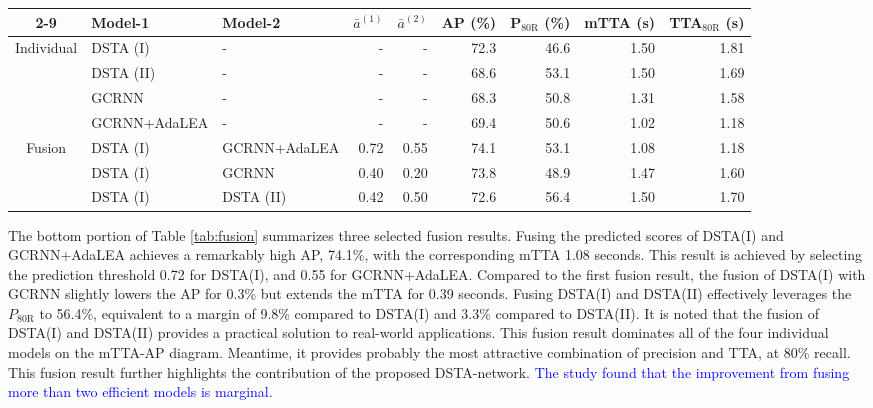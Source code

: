 \documentclass[journal]{IEEEtran}
\begin{document}
\begin{table*}[t]
\renewcommand{\arraystretch}{1.3}
\caption{Assessment of the fusion method}
    \label{tab:fusion}
    \centering
    \begin{tabular}{c|l|l|r|r|r|r|r|r}
        \cline{2-9}
          \multicolumn{1}{c}{}&Model-1 & Model-2& $\bar{a}^{(1)}$ & $\bar{a}^{(2)}$ & AP (\%) & P$_{80\text{R}}$ (\%)  & mTTA (s) & TTA$_{80\text{R}}$ (s)   \\
         \hline
        \multirow{4}{*}{Individual}& DSTA (I)&-&-&-& 72.3 & 46.6 & 1.50 & 1.81 \\ 
         & DSTA (II)&-&-&-& 68.6 & 53.1 & 1.50 & 1.69 \\
         &GCRNN &-&-&-& 68.3 & 50.8 & 1.31 & 1.58 \\
         &GCRNN+AdaLEA&-&-&- & 69.4 & 50.6 & 1.02 & 1.18 \\
         \hline
         \multirow{3}{*}{Fusion}& DSTA (I)& GCRNN+AdaLEA & 0.72 & 0.55 & 74.1 & 53.1 & 1.08 & 1.18 \\
         & DSTA (I)& GCRNN & 0.40 & 0.20 & 73.8 & 48.9 & 1.47 & 1.60 \\
        & DSTA (I)& DSTA (II) & 0.42 & 0.50 & 72.6 & 56.4 & 1.50 & 1.70 \\
        \hline
    \end{tabular}
\end{table*}

The bottom portion of Table \ref{tab:fusion} summarizes three selected fusion results. Fusing the predicted scores of DSTA(I) and GCRNN+AdaLEA achieves a remarkably high AP, 74.1\%, with the corresponding mTTA 1.08 seconds. This result is achieved by selecting the prediction threshold 0.72 for DSTA(I), and 0.55 for GCRNN+AdaLEA. Compared to the first fusion result, the fusion of DSTA(I) with GCRNN slightly lowers the AP for 0.3\% but extends the mTTA for 0.39 seconds. Fusing DSTA(I) and DSTA(II) effectively leverages the $P_{80\text{R}}$ to 56.4\%, equivalent to a margin of 9.8\% compared to DSTA(I) and 3.3\% compared to DSTA(II). It is noted that the fusion of DSTA(I) and DSTA(II) provides a practical solution to real-world applications. This fusion result dominates all of the four individual models on the mTTA-AP diagram. Meantime, it provides probably the most attractive combination of precision and TTA, at 80\% recall. This fusion result further highlights the contribution of the proposed DSTA-network. \textcolor{blue}{The study found that the improvement from fusing more than two efficient models is marginal.}
\end{document}
